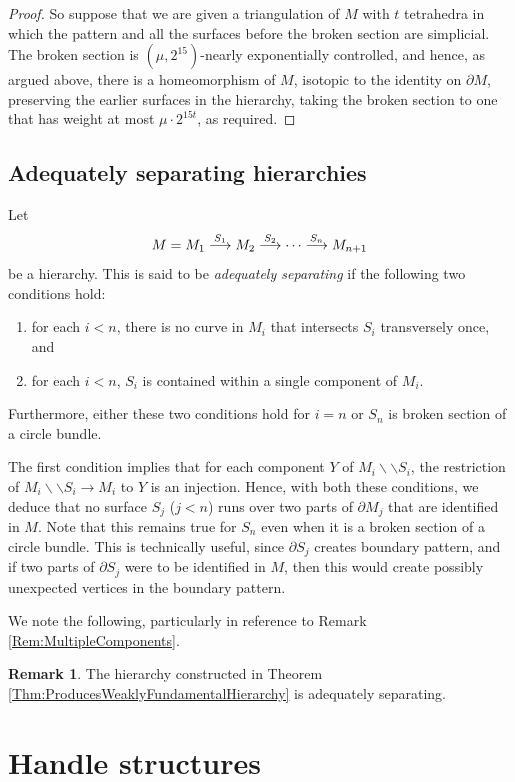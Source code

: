 \documentclass[oneside]{amsart}
\numberwithin{equation}{section}
\theoremstyle{plain}
\theoremstyle{definition}
\newtheorem{remark}[equation]{Remark}
\newcommand{\cut}{\backslash\backslash}
\begin{document}
\begin{proof}
So suppose that we are given a triangulation of $M$ with $t$ tetrahedra in which the pattern and all the surfaces before the broken section are simplicial. The broken section is $(\mu,2^{15})$-nearly exponentially controlled, and hence, as argued above, there is a homeomorphism of $M$, isotopic to the identity on $\partial M$, preserving the earlier surfaces in the hierarchy, taking the broken section to one that has weight at most $\mu \cdot 2^{15t}$, as required.
\end{proof}

\subsection{Adequately separating hierarchies}
Let
$$M = M_1 \buildrel S_1 \over \longrightarrow M_2 \buildrel S_2 \over \longrightarrow \dots
\buildrel S_{n} \over \longrightarrow M_{n+1}$$
be a hierarchy. This is said to be \emph{adequately separating} if the following two conditions hold:
\begin{enumerate}
\item for each $i < n$, there is no curve in $M_i$ that intersects $S_i$ transversely once, and
\item for each $i < n$, $S_i$ is contained within a single component of $M_i$.
\end{enumerate}
Furthermore, either these two conditions hold for $i = n$ or $S_n$ is broken section of a circle bundle.

The first condition implies that for each component $Y$ of $M_i \cut S_i$, the restriction of
$M_i \cut S_i \rightarrow M_i$ to $Y$ is an injection. Hence, with both these conditions,
we deduce that no surface $S_j$ ($j < n$) runs over two parts of $\partial M_j$ that are identified
in $M$. Note that this remains true for $S_n$ even when it is a broken section of a circle bundle.
This is technically useful, since $\partial S_j$ creates boundary pattern, and if two parts of
$\partial S_j$ were to be identified in $M$, then this would create possibly unexpected vertices
in the boundary pattern.

We note the following, particularly in reference to Remark \ref{Rem:MultipleComponents}.

\begin{remark} 
\label{Rem:AdequatelySeparating}
The hierarchy constructed in Theorem \ref{Thm:ProducesWeaklyFundamentalHierarchy} 
is adequately separating.
\end{remark}

\section{Handle structures}
\label{Sec:HandleStructures}
\end{document}
